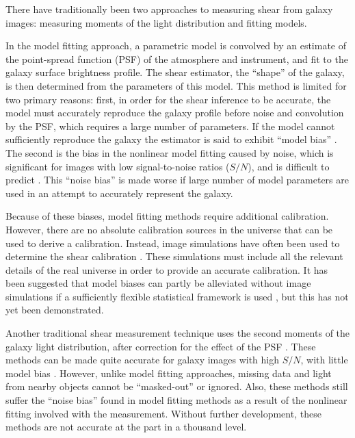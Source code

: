 \documentclass[iop]{emulateapj}
\newcommand{\snr}{$S/N$}
\begin{document}
There have traditionally been two approaches to measuring shear from
galaxy images: measuring moments of the light distribution and fitting models.

In the model fitting approach, a parametric model is convolved by an estimate
of the point-spread function (PSF) of the atmosphere and instrument, and fit to
the galaxy surface brightness profile.  The shear estimator, the ``shape'' of
the galaxy, is then determined from the parameters of this model.  This method
is limited for two primary reasons: first, in order for the shear inference to
be accurate, the model must accurately reproduce the galaxy profile before
noise and convolution by the PSF, which requires a large number of parameters.
If the model cannot sufficiently reproduce the galaxy the estimator is said to
exhibit ``model bias'' \citep{Bernstein2010}.  The second is the bias in the
nonlinear model fitting caused by noise, which is significant for images with low
signal-to-noise ratios (\snr), and is difficult to predict
\citep{HirataAlign04,Refreg12,Melchior12}.  This ``noise bias'' is made worse
if large number of model parameters are used in an attempt to accurately
represent the galaxy.

Because of these biases, model fitting methods require additional
calibration.  However, there are no absolute calibration sources in the
universe that can be used to derive a calibration.  Instead, image
simulations have often been used to determine the shear calibration
\citep[e.g.][]{Zuntz13,Miller13,KidsShear2017,Refregier13,Jee16}.  These
simulations must include all the relevant details of the real universe in order
to provide an accurate calibration.  It has been suggested that model biases
can partly be alleviated without image simulations if a sufficiently flexible
statistical framework is used \citep{SchneiderProbshear2015}, but this has not
yet been demonstrated.

Another traditional shear measurement technique uses the second moments of the
galaxy light distribution, after correction for the effect of the PSF
\citep[e.g.][]{ksb95,Bernstein2010}.  These methods can be made quite accurate
for galaxy images with high \snr, with little model bias
\citep{Bernstein2010,Okura2016}.  However, unlike model fitting approaches,
missing data and light from nearby objects cannot be ``masked-out'' or ignored.
Also, these methods still suffer the ``noise bias'' found in model fitting
methods as a result of the nonlinear fitting involved with the measurement.
Without further development, these methods are not accurate at the part in a
thousand level.
\end{document}
